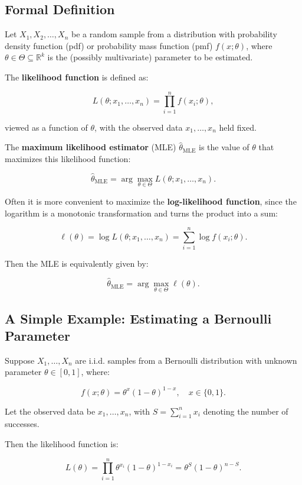 \documentclass{book}
\begin{document}
\subsection*{Formal Definition}

Let \( X_1, X_2, \dots, X_n \) be a random sample from a distribution with probability density function (pdf) or probability mass function (pmf) \( f(x; \theta) \), where \( \theta \in \Theta \subseteq \mathbb{R}^k \) is the (possibly multivariate) parameter to be estimated.

The \textbf{likelihood function} is defined as:

\[
L(\theta; x_1, \dots, x_n) = \prod_{i=1}^n f(x_i; \theta),
\]

viewed as a function of \( \theta \), with the observed data \( x_1, \dots, x_n \) held fixed.

The \textbf{maximum likelihood estimator} (MLE) \( \hat{\theta}_{\text{MLE}} \) is the value of \( \theta \) that maximizes this likelihood function:

\[
\hat{\theta}_{\text{MLE}} = \arg\max_{\theta \in \Theta} L(\theta; x_1, \dots, x_n).
\]

Often it is more convenient to maximize the \textbf{log-likelihood function}, since the logarithm is a monotonic transformation and turns the product into a sum:

\[
\ell(\theta) = \log L(\theta; x_1, \dots, x_n) = \sum_{i=1}^n \log f(x_i; \theta).
\]

Then the MLE is equivalently given by:

\[
\hat{\theta}_{\text{MLE}} = \arg\max_{\theta \in \Theta} \ell(\theta).
\]

\subsection*{A Simple Example: Estimating a Bernoulli Parameter}

Suppose \( X_1, \dots, X_n \) are i.i.d. samples from a Bernoulli distribution with unknown parameter \( \theta \in [0,1] \), where:

\[
f(x; \theta) = \theta^x (1 - \theta)^{1 - x}, \quad x \in \{0, 1\}.
\]

Let the observed data be \( x_1, \dots, x_n \), with \( S = \sum_{i=1}^n x_i \) denoting the number of successes.

Then the likelihood function is:

\[
L(\theta) = \prod_{i=1}^n \theta^{x_i}(1 - \theta)^{1 - x_i} = \theta^S (1 - \theta)^{n - S}.
\]
\end{document}

